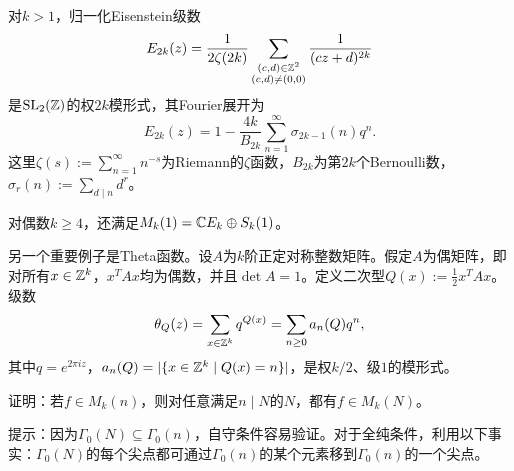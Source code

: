 \begin{example}\label{L6S1O3}
对$k>1$，归一化Eisenstein级数
\[E_{2k}(z)=\frac1{2\zeta(2k)}\sum_{\substack{(c,d)\in\mathbb{Z}^2\\(c,d)\ne(0,0)}}\frac1{(cz+d)^{2k}}\]
是$\operatorname{SL}_2(\mathbb{Z})$的权$2k$模形式，其Fourier展开为
\[E_{2k}(z)=1-\frac{4k}{B_{2k}}\sum_{n=1}^{\infty}\sigma_{2k-1}(n)q^n.\]
这里$\zeta(s):=\sum_{n=1}^{\infty}n^{-s}$为Riemann的$\zeta$函数，$B_{2k}$为第$2k$个Bernoulli数，$\sigma_r(n):=\sum_{d\mid n}d^r$。
\end{example}
对偶数$k\geq4$，还满足$M_k(1)=\mathbb{C} E_k\oplus S_k(1)$。
\begin{example}\label{L6S1O4}
另一个重要例子是Theta函数。设$A$为$k$阶正定对称整数矩阵。假定$A$为偶矩阵，即对所有$x\in\mathbb{Z}^k$，$x^TAx$均为偶数，并且$\det A=1$。定义二次型$Q(x):=\tfrac12x^TAx$。级数
\[\theta_Q(z)=\sum_{x\in\mathbb{Z}^k}q^{Q(x)}=\sum_{n\geq0}a_n(Q)q^n,\]
其中$q=e^{2\pi iz}$，$a_n(Q)=|\{x\in\mathbb{Z}^k\mid Q(x)=n\}|$，是权$k/2$、级$1$的模形式。
\end{example}
\begin{exercise*}\label{L6S1EX}
证明：若$f\in M_k(n)$，则对任意满足$n\mid N$的$N$，都有$f\in M_k(N)$。
\par 提示：因为$\Gamma_0(N)\subseteq\Gamma_0(n)$，自守条件容易验证。对于全纯条件，利用以下事实：$\Gamma_0(N)$的每个尖点都可通过$\Gamma_0(n)$的某个元素移到$\Gamma_0(n)$的一个尖点。
\end{exercise*}
